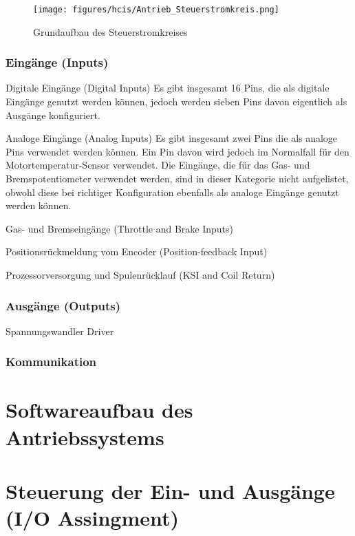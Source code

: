 \begin{figure}[H]
	\begin{center}
		\texttt{[image: figures/hcis/Antrieb\_Steuerstromkreis.png]}
		\caption{Grundaufbau des Steuerstromkreises}
	\end{center}
\end{figure}

\newpage



\subsubsection{Eingänge (Inputs)}
Digitale Eingänge (Digital Inputs)
Es gibt insgesamt 16 Pins, die als digitale Eingänge genutzt werden können, jedoch werden sieben Pins davon eigentlich als Ausgänge konfiguriert. 

Analoge Eingänge (Analog Inputs)
Es gibt insgesamt zwei Pins die als analoge Pins verwendet werden können. Ein Pin davon wird jedoch im Normalfall für den Motortemperatur-Sensor verwendet. Die Eingänge, die für das Gas- und Bremspotentiometer verwendet werden, sind in dieser Kategorie nicht aufgelistet, obwohl diese bei richtiger Konfiguration ebenfalls als analoge Eingänge genutzt werden können.

Gas- und Bremseingänge (Throttle and Brake Inputs)

Positionsrückmeldung vom Encoder (Position-feedback Input)

Prozessorversorgung und Spulenrücklauf (KSI and Coil Return)



\subsubsection{Ausgänge (Outputs)}
Spannungswandler
Driver
\subsubsection{Kommunikation}



\section{Softwareaufbau des Antriebssystems}


\section{ Steuerung der Ein- und Ausgänge (I/O Assingment)}
